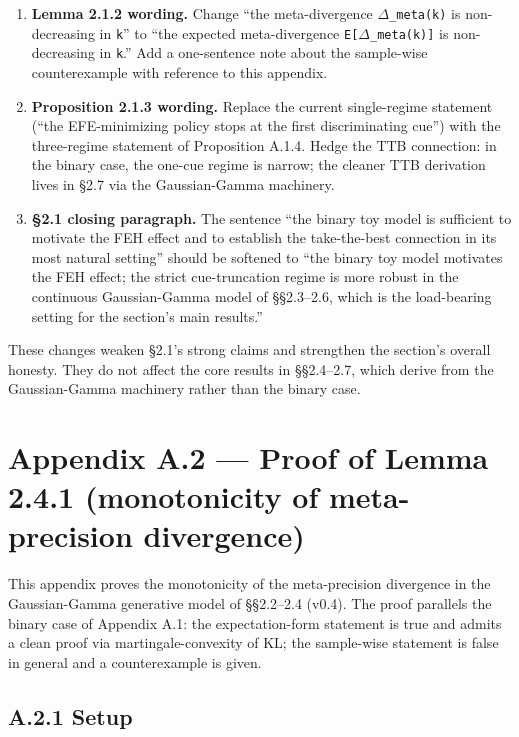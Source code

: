\documentclass{article}
\begin{document}
\begin{enumerate}
\def\labelenumi{\arabic{enumi}.}
\item
  \textbf{Lemma 2.1.2 wording.} Change ``the meta-divergence
  \texttt{\ensuremath{\Delta}\_meta(k)} is non-decreasing in \texttt{k}'' to ``the
  expected meta-divergence \texttt{E{[}\ensuremath{\Delta}\_meta(k){]}} is non-decreasing
  in \texttt{k}.'' Add a one-sentence note about the sample-wise
  counterexample with reference to this appendix.
\item
  \textbf{Proposition 2.1.3 wording.} Replace the current single-regime
  statement (``the EFE-minimizing policy stops at the first
  discriminating cue'') with the three-regime statement of Proposition
  A.1.4. Hedge the TTB connection: in the binary case, the one-cue
  regime is narrow; the cleaner TTB derivation lives in \S{}2.7 via the
  Gaussian-Gamma machinery.
\item
  \textbf{\S{}2.1 closing paragraph.} The sentence ``the binary toy model
  is sufficient to motivate the FEH effect and to establish the
  take-the-best connection in its most natural setting'' should be
  softened to ``the binary toy model motivates the FEH effect; the
  strict cue-truncation regime is more robust in the continuous
  Gaussian-Gamma model of \S{}\S{}2.3--2.6, which is the load-bearing setting
  for the section's main results.''
\end{enumerate}

These changes weaken \S{}2.1's strong claims and strengthen the section's
overall honesty. They do not affect the core results in \S{}\S{}2.4--2.7,
which derive from the Gaussian-Gamma machinery rather than the binary
case.

\section{Appendix A.2 --- Proof of Lemma 2.4.1 (monotonicity of
meta-precision
divergence)}\label{appendix-a.2-proof-of-lemma-2.4.1-monotonicity-of-meta-precision-divergence}

This appendix proves the monotonicity of the meta-precision divergence
in the Gaussian-Gamma generative model of \S{}\S{}2.2--2.4 (v0.4). The proof
parallels the binary case of Appendix A.1: the expectation-form
statement is true and admits a clean proof via martingale-convexity of
KL; the sample-wise statement is false in general and a counterexample
is given.

\subsection{A.2.1 Setup}\label{a.2.1-setup}
\end{document}
